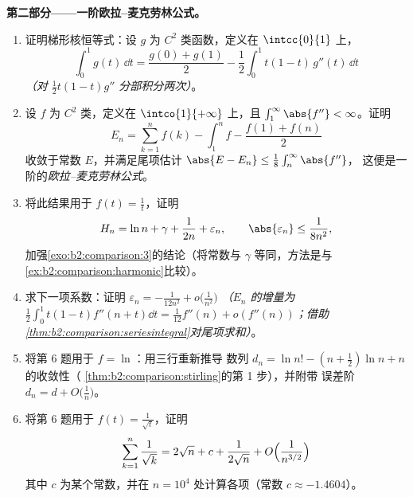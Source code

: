 \begin{problem}
\medskip
\noindent\textbf{第二部分——一阶欧拉–麦克劳林公式。}
\begin{enumerate}[resume]
  \item 证明梯形核恒等式：设 $g$ 为
        $C^2$ 类函数，定义在 $\intcc{0}{1}$ 上，
        \[
        \int_0^1 g(t)\,\dd t = \frac{g(0) + g(1)}{2}
        - \frac12\int_0^1 t(1 - t)\,g''(t)\,\dd t
        \]
        \emph{（对 $\frac12 t(1-t)g''$ 分部积分两次）}。
  \item 设 $f$ 为 $C^2$ 类，定义在 $\intco{1}{+\infty}$ 上，且
        $\int_1^\infty \abs{f''} < \infty$。证明
        \[
        E_n = \sum_{k=1}^{n} f(k) - \int_1^n f -
        \frac{f(1) + f(n)}{2}
        \]
        收敛于常数 $E$，并满足尾项估计
        $\abs{E - E_n} \leq \frac18\int_n^\infty\abs{f''}$，
        这便是一阶的\emph{欧拉–麦克劳林公式}。
  \item 将此结果用于 $f(t) = \frac1t$，证明
        \[
        H_n = \ln n + \gamma + \frac{1}{2n} + \varepsilon_n,
        \qquad \abs{\varepsilon_n} \leq \frac{1}{8n^2},
        \]
        加强\cref{exo:b2:comparison:3}的结论（将常数与
        $\gamma$ 等同，方法是与
        \cref{ex:b2:comparison:harmonic}比较）。
  \item 求下一项系数：证明 $\varepsilon_n =
        -\frac{1}{12n^2} + o\bigl(\frac1{n^2}\bigr)$
        \emph{（$E_n$ 的增量为
        $\frac12\int_0^1t(1-t)f''(n+t)\dd t =
        \frac1{12}f''(n) + o(f''(n))$；借助
        \cref{thm:b2:comparison:seriesintegral}对尾项求和）}。
  \item 将第 6 题用于 $f = \ln$：用三行重新推导
        数列 $d_n = \ln n! - (n +
        \frac12)\ln n + n$ 的收敛性（
        \cref{thm:b2:comparison:stirling}的第 1 步），并附带
        误差阶 $d_n = d + O\bigl(\frac1n\bigr)$。
  \item 将第 6 题用于 $f(t) = \frac{1}{\sqrt t}$，证明
        \[
        \sum_{k=1}^{n}\frac1{\sqrt k} = 2\sqrt n + c +
        \frac{1}{2\sqrt n} + O\Bigl(\frac{1}{n^{3/2}}\Bigr)
        \]
        其中 $c$ 为某个常数，并在 $n =
        10^4$ 处计算各项（常数 $c \approx -1.4604$）。
\end{enumerate}


\end{problem}
